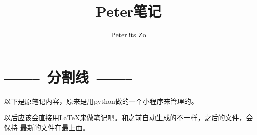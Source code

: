 \documentclass{peterlitsdoc}
\author{Peterlits Zo}
\title{Peter笔记}
\begin{document}
\maketitle
\tableofcontents
\newpage


\section{\texttt{--------------}\ 分割线\ \texttt{--------------}}
以下是原笔记内容，原来是用python做的一个小程序来管理的。

以后应该会直接用\LaTeX{}来做笔记吧。和之前自动生成的不一样，之后的文件，会保持
最新的文件在最上面。

\titlespacing{\section}{0pt}{7em}{0em}


\end{document}
